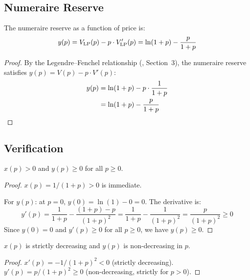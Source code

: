 \subsection{Numeraire Reserve}

\begin{proposition}\label{prop:numeraire-reserve}
The numeraire reserve as a function of price is:
\begin{equation}\label{eq:numeraire-reserve}
  y(p) = V_{\mathrm{LP}}(p) - p \cdot V_{\mathrm{LP}}'(p) = \ln(1+p) - \frac{p}{1+p}
\end{equation}
\end{proposition}

\begin{proof}
By the Legendre--Fenchel relationship (\cite{angeris2023geometry}, Section~3),
the numeraire reserve satisfies $y(p) = V(p) - p \cdot V'(p)$:
\begin{align}
  y(p) &= \ln(1+p) - p \cdot \frac{1}{1+p} \notag\\
       &= \ln(1+p) - \frac{p}{1+p} \label{eq:y-derivation}
\end{align}
\end{proof}

\subsection{Verification}

\begin{lemma}\label{lem:reserve-nonneg}
$x(p) > 0$ and $y(p) \geq 0$ for all $p \geq 0$.
\end{lemma}

\begin{proof}
$x(p) = 1/(1+p) > 0$ is immediate.

For $y(p)$: at $p = 0$, $y(0) = \ln(1) - 0 = 0$. The derivative is:
\[
  y'(p) = \frac{1}{1+p} - \frac{(1+p) - p}{(1+p)^2}
        = \frac{1}{1+p} - \frac{1}{(1+p)^2}
        = \frac{p}{(1+p)^2} \geq 0
\]
Since $y(0) = 0$ and $y'(p) \geq 0$ for all $p \geq 0$, we have $y(p) \geq 0$. \qedhere
\end{proof}

\begin{lemma}\label{lem:reserve-monotone}
$x(p)$ is strictly decreasing and $y(p)$ is non-decreasing in $p$.
\end{lemma}

\begin{proof}
$x'(p) = -1/(1+p)^2 < 0$ (strictly decreasing).
$y'(p) = p/(1+p)^2 \geq 0$ (non-decreasing, strictly for $p > 0$). \qedhere
\end{proof}

